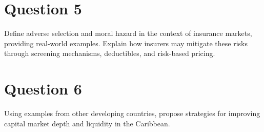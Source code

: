 \section*{Question 5}

Define adverse selection and moral hazard in the context of insurance markets,
providing real-world examples. Explain how insurers may mitigate these risks
through screening mechanisms, deductibles, and risk-based pricing.


\section*{Question 6}

Using examples from other developing countries, propose strategies for improving
capital market depth and liquidity in the Caribbean.


